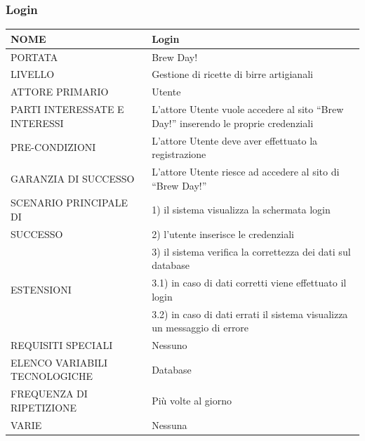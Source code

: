 \documentclass[a4paper, titlepage]{article}
\begin{document}
\subsubsection{Login}
\begin{longtable}{p{6cm}p{7cm}}\toprule
    NOME & Login\\\midrule
    PORTATA & Brew Day!\\\midrule
    LIVELLO & Gestione di ricette di birre artigianali\\\midrule
    ATTORE PRIMARIO & Utente\\\midrule
    PARTI INTERESSATE E INTERESSI & L’attore Utente vuole accedere al sito “Brew Day!” inserendo le proprie credenziali\\\midrule
    PRE-CONDIZIONI & L’attore Utente deve aver effettuato la registrazione\\\midrule
    GARANZIA DI SUCCESSO & L’attore Utente riesce ad accedere al sito di “Brew Day!”\\\midrule
    SCENARIO PRINCIPALE DI
    & 1) il sistema visualizza la schermata login\\
    SUCCESSO & 2) l’utente inserisce le credenziali\\
    & 3) il sistema verifica la correttezza
    dei dati sul database\\\midrule
    ESTENSIONI &
    3.1) in caso di dati corretti viene effettuato il login\\
    & 3.2) in caso di dati errati il sistema
    visualizza un messaggio di errore\\\midrule
    REQUISITI SPECIALI & Nessuno \\\midrule
    ELENCO VARIABILI TECNOLOGICHE & Database\\\midrule
    FREQUENZA DI RIPETIZIONE & Più volte al giorno\\\midrule
    VARIE & Nessuna\\\bottomrule
\end{longtable}
\vphantom{}
\end{document}
